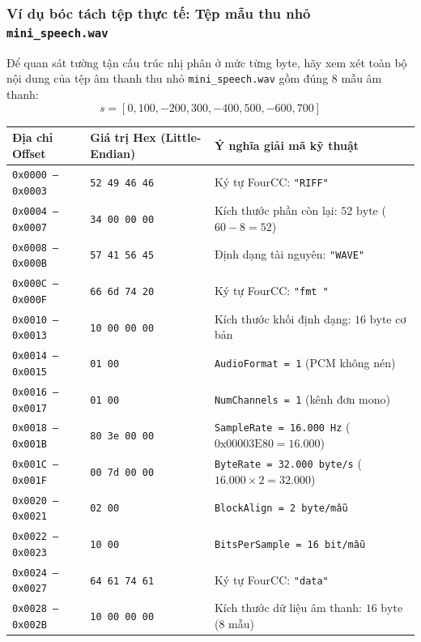 \subsubsection*{Ví dụ bóc tách tệp thực tế: Tệp mẫu thu nhỏ \texttt{mini\_speech.wav}}
Để quan sát tường tận cấu trúc nhị phân ở mức từng byte, hãy xem xét toàn bộ nội dung của tệp âm thanh thu nhỏ \texttt{mini\_speech.wav} gồm đúng 8 mẫu âm thanh:
\begin{equation}
s = [0, 100, -200, 300, -400, 500, -600, 700]
\end{equation}
\begin{center}
\small
\begin{tabular}{lll}
\toprule
Địa chỉ Offset & Giá trị Hex (Little-Endian) & Ý nghĩa giải mã kỹ thuật \\
\midrule
\texttt{0x0000 -- 0x0003} & \texttt{52 49 46 46} & Ký tự FourCC: \texttt{"RIFF"} \\
\texttt{0x0004 -- 0x0007} & \texttt{34 00 00 00} & Kích thước phần còn lại: $52\text{ byte}$ ($60 - 8 = 52$) \\
\texttt{0x0008 -- 0x000B} & \texttt{57 41 56 45} & Định dạng tài nguyên: \texttt{"WAVE"} \\
\midrule
\texttt{0x000C -- 0x000F} & \texttt{66 6d 74 20} & Ký tự FourCC: \texttt{"fmt "} \\
\texttt{0x0010 -- 0x0013} & \texttt{10 00 00 00} & Kích thước khối định dạng: $16\text{ byte}$ cơ bản \\
\texttt{0x0014 -- 0x0015} & \texttt{01 00} & \texttt{AudioFormat = 1} (PCM không nén) \\
\texttt{0x0016 -- 0x0017} & \texttt{01 00} & \texttt{NumChannels = 1} (kênh đơn mono) \\
\texttt{0x0018 -- 0x001B} & \texttt{80 3e 00 00} & \texttt{SampleRate = 16.000 Hz} ($0\text{x}00003\text{E}80 = 16.000$) \\
\texttt{0x001C -- 0x001F} & \texttt{00 7d 00 00} & \texttt{ByteRate = 32.000 byte/s} ($16.000 \times 2 = 32.000$) \\
\texttt{0x0020 -- 0x0021} & \texttt{02 00} & \texttt{BlockAlign = 2 byte/mẫu} \\
\texttt{0x0022 -- 0x0023} & \texttt{10 00} & \texttt{BitsPerSample = 16 bit/mẫu} \\
\midrule
\texttt{0x0024 -- 0x0027} & \texttt{64 61 74 61} & Ký tự FourCC: \texttt{"data"} \\
\texttt{0x0028 -- 0x002B} & \texttt{10 00 00 00} & Kích thước dữ liệu âm thanh: $16\text{ byte}$ (8 mẫu) \\

\end{tabular}
\end{center}
